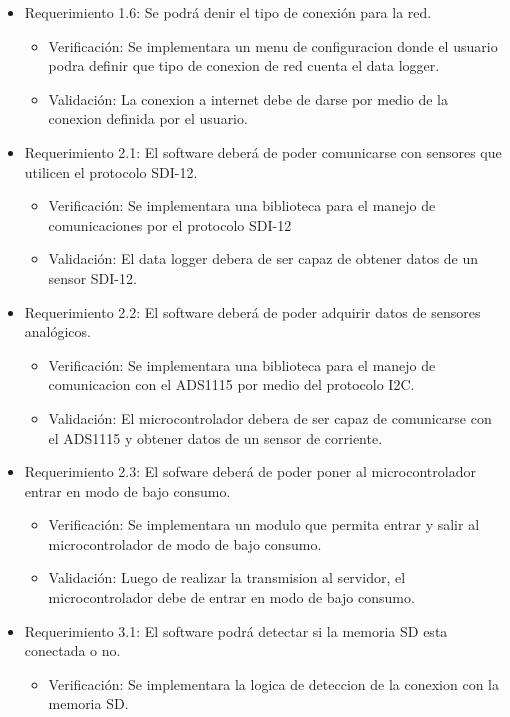 \documentclass[
11pt, %
]{charter}
\begin{document}
\begin{itemize}
\begin{itemize}
	\end{itemize}
\item Requerimiento 1.6: Se podrá denir el tipo de conexión para la red.
	\begin{itemize}
		\item Verificación: Se implementara un menu de configuracion donde el usuario podra definir que tipo de conexion de red cuenta el data logger.
		\item Validación: La conexion a internet debe de darse por medio de la conexion definida por el usuario. 
	\end{itemize}
\item Requerimiento 2.1: El software deberá de poder comunicarse con sensores que utilicen el protocolo SDI-12.
	\begin{itemize}
		\item Verificación: Se implementara una biblioteca para el manejo de comunicaciones por el protocolo SDI-12
		\item Validación: El data logger debera de ser capaz de obtener datos de un sensor SDI-12.
	\end{itemize}
\item Requerimiento 2.2: El software deberá de poder adquirir datos de sensores analógicos.
	\begin{itemize}
		\item Verificación: Se implementara una biblioteca para el manejo de comunicacion con el ADS1115 por medio del protocolo I2C.
		\item Validación: El microcontrolador debera de ser capaz de comunicarse con el ADS1115 y obtener datos de un sensor de corriente.
	\end{itemize}	
\item Requerimiento 2.3: El sofware deberá de poder poner al microcontrolador entrar en modo de bajo consumo.
	\begin{itemize}
		\item Verificación: Se implementara un modulo que permita entrar y salir al microcontrolador de modo de bajo consumo. 
		\item Validación: Luego de realizar la transmision al servidor, el microcontrolador debe de entrar en modo de bajo consumo.
	\end{itemize}
\item Requerimiento 3.1: El software podrá detectar si la memoria SD esta conectada o no.
	\begin{itemize}
		\item Verificación: Se implementara la logica de deteccion de la conexion con la memoria SD.

\end{itemize}
\end{itemize}
\end{document}
